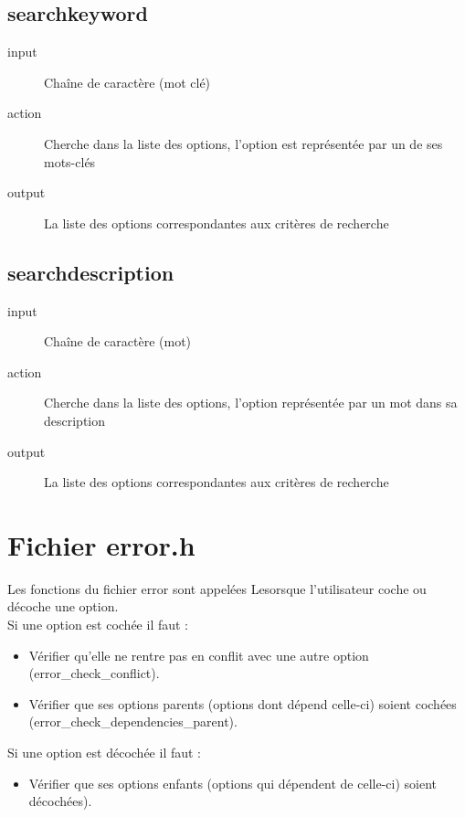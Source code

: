 \documentclass[16pts]{report}
\begin{document}
\section{search\textunderscore keyword}
\label{sec:search keyword}
\begin{description}
    \item[input] Chaîne de caractère (mot clé)
    \item[action] Cherche dans la liste des options, l’option est représentée par un de ses mots-clés
    \item[output] La liste des options correspondantes aux critères de recherche
\end{description}

\section{search\textunderscore description}
\label{sec:search description}
\begin{description}
    \item[input] Chaîne de caractère (mot)
    \item[action] Cherche dans la liste des options, l’option représentée par un mot dans sa description
    \item[output] La liste des options correspondantes aux critères de recherche
\end{description}


\chapter{Fichier error.h}
\label{cha:Fichier error.h}
Les fonctions du fichier error sont appelées Lesorsque l’utilisateur coche ou
décoche une option. \\
Si une option est cochée il faut :
\begin{itemize}
    \item Vérifier qu’elle ne rentre pas en conflit avec une autre option
        (error\_check\_conflict).
    \item Vérifier que ses options parents (options dont dépend celle-ci)
        soient cochées (error\_check\_dependencies\_parent).
\end{itemize}

Si une option est décochée il faut :
\begin{itemize}
    \item Vérifier que ses options enfants (options qui dépendent de
        celle-ci) soient décochées).
\end{itemize}
\end{document}
